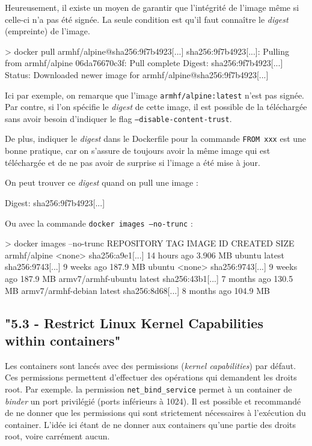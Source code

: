 \documentclass[11pt,a4paper,oneside]{report}
\newcommand{\code}[1]{\texttt{#1}}
\begin{document}
Heureusement, il existe un moyen de garantir que l'intégrité de l'image même si celle-ci n'a pas été signée. La seule condition est qu'il faut connaître le \textit{digest} (empreinte) de l'image.

\begin{textcode}
> docker pull armhf/alpine@sha256:9f7b4923[...]
sha256:9f7b4923[...]: Pulling from armhf/alpine
06da76670c3f: Pull complete
Digest: sha256:9f7b4923[...]
Status: Downloaded newer image for armhf/alpine@sha256:9f7b4923[...]
\end{textcode}

Ici par exemple, on remarque que l'image \code{armhf/alpine:latest} n'est pas signée. Par contre, si l'on spécifie le \textit{digest} de cette image, il est possible de la téléchargée sans avoir besoin d'indiquer le flag \code{--disable-content-trust}.

De plus, indiquer le \textit{digest} dans le Dockerfile pour la commande \code{FROM xxx} est une bonne pratique, car on s'assure de toujours avoir la même image qui est téléchargée et de ne pas avoir de surprise si l'image a été mise à jour.

On peut trouver ce \textit{digest} quand on pull une image :
\begin{textcode}
Digest: sha256:9f7b4923[...]
\end{textcode}

Ou avec la commande \code{docker images --no-trunc} :

\begin{textcode}
> docker images --no-trunc
REPOSITORY          TAG     IMAGE ID           CREATED        SIZE
armhf/alpine        <none>  sha256:a9e1[...]   14 hours ago   3.906 MB
ubuntu              latest  sha256:9743[...]   9 weeks ago    187.9 MB
ubuntu              <none>  sha256:9743[...]   9 weeks ago    187.9 MB
armv7/armhf-ubuntu  latest  sha256:43b1[...]   7 months ago   130.5 MB
armv7/armhf-debian  latest  sha256:8d68[...]   8 months ago   104.9 MB
\end{textcode}

\subsection{"5.3  - Restrict Linux Kernel Capabilities within containers"}\label{ss-restrict-kernel-capa}
Les containers sont lancés avec des permissions (\textit{kernel capabilities}) par défaut. Ces permissions permettent d'effectuer des opérations qui demandent les droits root. Par exemple. la permission \code{net\_bind\_service} permet à un container de \textit{binder} un port privilégié (ports inférieurs à 1024). Il est possible et recommandé de ne donner que les permissions qui sont strictement nécessaires à l'exécution du container. L'idée ici étant de ne donner aux containers qu'une partie des droits root, voire carrément aucun.
\end{document}
